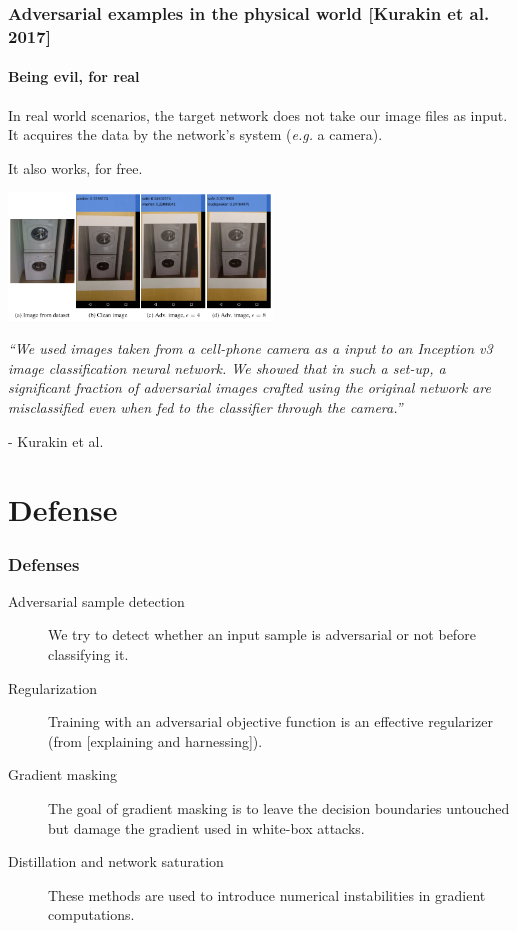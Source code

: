 \documentclass[9pt]{beamer}
\begin{document}
\begin{frame}
  \frametitle{Adversarial examples in the physical world [Kurakin et
      al. 2017]}

  \framesubtitle{Being evil, for real}

  In real world scenarios, the target network does not take our image
  files as input. It acquires the data by the network's system
  (\textit{e.g.} a camera).

  \pause

  \medskip

  It also works, for free.

  \begin{center}
    \includegraphics[width = 7cm]{images/physical_adversarial_sample.png}
  \end{center}


  \textit{``We used images taken from a cell-phone camera as a input
    to an Inception v3 image classification neural network. We showed
    that in such a set-up, a significant fraction of adversarial
    images crafted using the original network are misclassified even
    when fed to the classifier through the camera.''}

  \smallskip

  - Kurakin et al.
\end{frame}

\section{Defense}

\begin{frame}
  \frametitle{Defenses}

  \begin{description}
  \item[Adversarial sample detection] We try to detect whether an
    input sample is adversarial or not before classifying it.
  \item[Regularization] Training with an adversarial objective
    function is an effective regularizer (from [explaining and
      harnessing]).
  \item[Gradient masking] The goal of gradient masking is to leave the
    decision boundaries untouched but damage the gradient used in
    white-box attacks.
  \item[Distillation and network saturation] These methods are used to
    introduce numerical instabilities in gradient computations.
  \end{description}
\end{frame}
\end{document}
